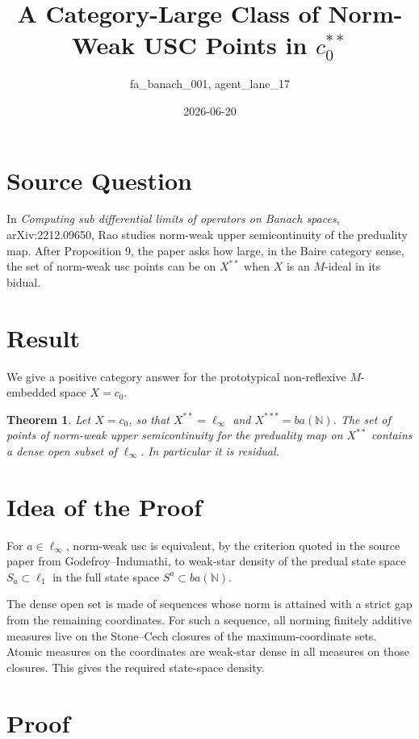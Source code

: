 \documentclass[11pt]{article}
\title{A Category-Large Class of Norm-Weak USC Points in \(c_0^{**}\)}
\author{fa\_banach\_001, agent\_lane\_17}
\date{2026-06-20}
\newtheorem{theorem}{Theorem}
\begin{document}
\maketitle

\section*{Source Question}

In \emph{Computing sub differential limits of operators on Banach spaces},
arXiv:2212.09650, Rao studies norm-weak upper semicontinuity of the
preduality map. After Proposition 9, the paper asks how large, in the Baire
category sense, the set of norm-weak usc points can be on \(X^{**}\) when
\(X\) is an \(M\)-ideal in its bidual.

\section*{Result}

We give a positive category answer for the prototypical non-reflexive
\(M\)-embedded space \(X=c_0\).

\begin{theorem}
Let \(X=c_0\), so that \(X^{**}=\ell_\infty\) and \(X^{***}=ba(\mathbb N)\).
The set of points of norm-weak upper semicontinuity for the preduality map on
\(X^{**}\) contains a dense open subset of \(\ell_\infty\). In particular it is
residual.
\end{theorem}

\section*{Idea of the Proof}

For \(a\in\ell_\infty\), norm-weak usc is equivalent, by the criterion quoted
in the source paper from Godefroy--Indumathi, to weak-star density of the
predual state space \(S_a\subset \ell_1\) in the full state space
\(S^a\subset ba(\mathbb N)\).

The dense open set is made of sequences whose norm is attained with a strict
gap from the remaining coordinates. For such a sequence, all norming finitely
additive measures live on the Stone--Cech closures of the maximum-coordinate
sets. Atomic measures on the coordinates are weak-star dense in all measures
on those closures. This gives the required state-space density.

\section*{Proof}
\end{document}
